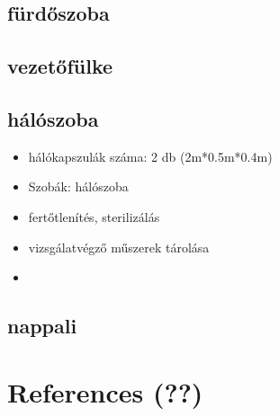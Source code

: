\documentclass{report}
\begin{document}
\subsection{fürdőszoba}
\subsection{vezetőfülke}
\subsection{hálószoba}
\begin{itemize}
    \item hálókapszulák száma: 2 db (2m*0.5m*0.4m)
    \item Szobák: hálószoba 
    \item fertőtlenítés, sterilizálás
    \item vizsgálatvégző műszerek tárolása
    \item 
\end{itemize}
\subsection{nappali}



\section{References (??)}
\end{document}
